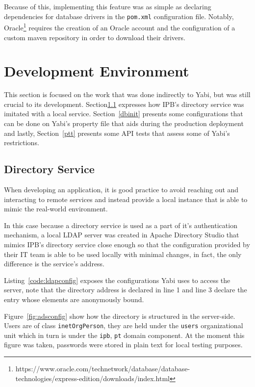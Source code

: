 Because of this, implementing this feature was as simple as declaring dependencies for database drivers in the \texttt{pom.xml} configuration file. Notably, Oracle\footnote{https://www.oracle.com/technetwork/database/database-technologies/express-edition/downloads/index.html} requires the creation of an Oracle account and the configuration of a custom maven repository in order to download their drivers.

\section{Development Environment}\label{cha:implementation:sec:development}
This section is focused on the work that was done indirectly to \gls{Yabi}, but was still crucial to its development. Section\ref{ds} expresses how \gls{IPB}'s directory service was imitated with a local service. Section~\ref{dbinit} presents some configurations that can be done on \gls{Yabi}'s property file that aids during the production deployment and lastly, Section~\ref{ptt} presents some \gls{API} tests that assess some of \gls{Yabi}'s restrictions.

\subsection{Directory Service}\label{ds}
When developing an application, it is good practice to avoid reaching out and interacting to remote services and instead provide a local instance that is able to mimic the real-world environment.

In this case because a directory service is used as a part of it's authentication mechanism, a local \gls{LDAP} server was created in Apache Directory Studio that mimics \gls{IPB}'s directory service close enough so that the configuration provided by their \gls{IT} team is able to be used locally with minimal changes, in fact, the only difference is the service's address.

Listing~\ref{code:ldapconfig} exposes the configurations \gls{Yabi} uses to access the server, note that the directory address is declared in line 1 and line 3 declare the entry whose elements are anonymously bound.



Figure~\ref{fig:adsconfig} show how the directory is structured in the server-side. Users are of class \texttt{inetOrgPerson}, they are held under the \texttt{users} organizational unit which in turn is under the \texttt{ipb}, \texttt{pt} domain component. At the moment this figure was taken, passwords were stored in plain text for local testing purposes.

